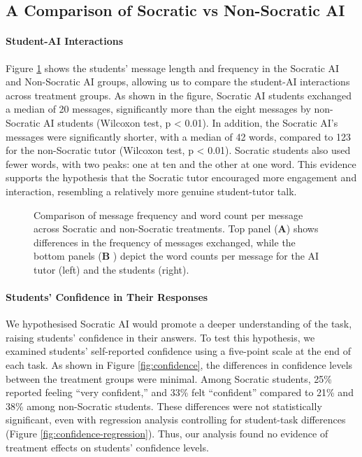\documentclass[
  11pt,
]{article}
\makeatletter
\newcommand*\pandocbounded[1]{%
  \sbox\pandoc@box{#1}%
  \Gscale@div\@tempa{\textheight}{\dimexpr\ht\pandoc@box+\dp\pandoc@box\relax}%
  \Gscale@div\@tempb{\linewidth}{\wd\pandoc@box}%
  \ifdim\@tempb\p@<\@tempa\p@\let\@tempa\@tempb\fi%
  \ifdim\@tempa\p@<\p@\scalebox{\@tempa}{\usebox\pandoc@box}%
  \else\usebox{\pandoc@box}%
  \fi%
}
\makeatother
\begin{document}
\subsection{A Comparison of Socratic vs Non-Socratic AI}\label{a-comparison-of-socratic-vs-non-socratic-ai}

\paragraph*{Student-AI Interactions}\label{student-ai-interactions}

Figure \ref{fig:messages} shows the students' message length and frequency in the Socratic AI and Non-Socratic AI groups, allowing us to compare the student-AI interactions across treatment groups. As shown in the figure, Socratic AI students exchanged a median of 20 messages, significantly more than the eight messages by non-Socratic AI students (Wilcoxon test, p \textless{} 0.01). In addition, the Socratic AI's messages were significantly shorter, with a median of 42 words, compared to 123 for the non-Socratic tutor (Wilcoxon test, p \textless{} 0.01). Socratic students also used fewer words, with two peaks: one at ten and the other at one word. This evidence supports the hypothesis that the Socratic tutor encouraged more engagement and interaction, resembling a relatively more genuine student-tutor talk.

\begin{figure}
\centering
\pandocbounded{\texttt{[image: main\_report\_files/figure-latex/messages-1.pdf]}}
\caption{\label{fig:messages}Comparison of message frequency and word count per message across Socratic and non-Socratic treatments. Top panel (\textbf{A}) shows differences in the frequency of messages exchanged, while the bottom panels (\textbf{B} ) depict the word counts per message for the AI tutor (left) and the students (right).}
\end{figure}

\paragraph*{Students' Confidence in Their Responses}\label{students-confidence-in-their-responses}

We hypothesised Socratic AI would promote a deeper understanding of the task, raising students' confidence in their answers. To test this hypothesis, we examined students' self-reported confidence using a five-point scale at the end of each task. As shown in Figure \ref{fig:confidence}, the differences in confidence levels between the treatment groups were minimal. Among Socratic students, 25\% reported feeling ``very confident,'' and 33\% felt ``confident'' compared to 21\% and 38\% among non-Socratic students. These differences were not statistically significant, even with regression analysis controlling for student-task differences (Figure \ref{fig:confidence-regression}). Thus, our analysis found no evidence of treatment effects on students' confidence levels.
\end{document}
